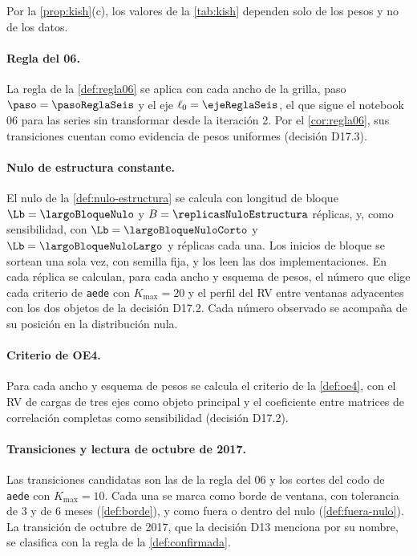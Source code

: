 Por la \cref{prop:kish}(c), los valores de la \cref{tab:kish} dependen solo de los pesos y no de
los datos.

\paragraph{Regla del 06.} La regla de la \cref{def:regla06} se aplica con cada ancho de la grilla,
paso $\paso=\pasoReglaSeis$ y el eje $\ell_0=\ejeReglaSeis$, el que sigue el notebook 06 para las series sin transformar desde
la iteración 2. Por el \cref{cor:regla06}, sus transiciones cuentan como evidencia de pesos
uniformes (decisión D17.3).

\paragraph{Nulo de estructura constante.} El nulo de la \cref{def:nulo-estructura} se calcula con
longitud de bloque $\Lb=\largoBloqueNulo$ y $B=\replicasNuloEstructura$ réplicas, y, como
sensibilidad, con $\Lb=\largoBloqueNuloCorto$ y $\Lb=\largoBloqueNuloLargo$ y
\replicasNuloSensibilidad{} réplicas cada una. Los inicios de bloque se sortean una sola vez, con
semilla fija, y los leen las dos implementaciones. En cada réplica se calculan, para cada ancho y
esquema de pesos, el número que elige cada criterio de \texttt{aede} con $K_{\max}=20$ y el perfil
del RV entre ventanas adyacentes con los dos objetos de la decisión D17.2. Cada número observado
se acompaña de su posición en la distribución nula.

\paragraph{Criterio de OE4.} Para cada ancho y esquema de pesos se calcula el criterio de la
\cref{def:oe4}, con el RV de cargas de tres ejes como objeto principal y el coeficiente entre
matrices de correlación completas como sensibilidad (decisión D17.2).

\paragraph{Transiciones y lectura de octubre de 2017.} Las transiciones candidatas son las de la
regla del 06 y los cortes del codo de \texttt{aede} con $K_{\max}=10$. Cada una se marca como borde
de ventana, con tolerancia de 3 y de 6 meses (\cref{def:borde}), y como fuera o dentro del nulo
(\cref{def:fuera-nulo}). La transición de octubre de 2017, que la decisión D13 menciona por su
nombre, se clasifica con la regla de la \cref{def:confirmada}.

